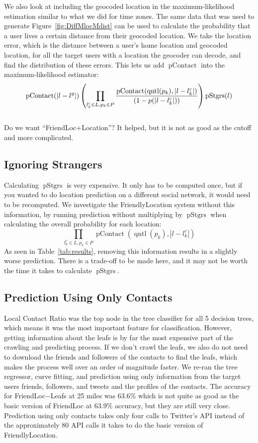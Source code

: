 \documentclass[letterpaper]{article}
\DeclareMathOperator{\pContact}{pContact}
\DeclareMathOperator{\pLocation}{pContact}
\DeclareMathOperator{\pStrangers}{pStgrs}
\DeclareMathOperator{\quantile}{qntl}
\begin{document}
We also look at including the geocoded location in the maximum-likelihood
estimation similar to what we did for time zones.
%
The same data that was used to generate Figure~\ref{fig:DiffMlocMdist} can be
used to calculate the probability that a user lives a certain distance from
their geocoded location.
%
We take the location error, which is the distance between a user's home
location and geocoded location, for all the target users with a location the
geocoder can decode, and find the distribution of these errors.
%
This lets us add $\pLocation$ into the maximum-likelihood estimator:
\[
    \pLocation(|l-l^g|)
    \left(
        \prod_{l^c_k \in L,p_k \in P}
        {\pContact(\quantile(p_k),|l-l^c_k|) \over (1-p(|l-l^c_k|))}
    \right)
    \pStrangers(l)
\]
\\{Do we want ``FriendLoc+Location''? It helped, but it is not as good as the
    cutoff and more complicated.}

\fi

\subsection{Ignoring Strangers}
Calculating $\pStrangers$ is very expensive.
%
It only has to be computed once, but if you wanted to do location prediction on
a different social network, it would need to be recomputed.
%
We investigate the FriendlyLocation system without this information, by running
prediction without multiplying by $\pStrangers$ when calculating the overall
probability for each location:
\[
    \prod_{l^c_k \in L,p_k \in P} \pContact(\quantile(p_k),|l-l^c_k|)
\]
As seen in Table~\ref{tab:results}, removing this information results in a
slightly worse prediction.
%
There is a trade-off to be made here, and it may not be worth the time it takes
to calculate $\pStrangers$.

\subsection{Prediction Using Only Contacts}
Local Contact Ratio was the top node in the tree classifier for all 5 decision
trees, which means it was the most important feature for classification.
%
However, getting information about the leafs is by far the most expensive part
of the crawling and predicting process.
%
If we don't crawl the leafs, we also do not need to download the friends and
followers of the contacts to find the leafs, which makes the process well over
an order of magnitude faster.
%
We re-ran the tree regressor, curve fitting, and prediction using only
information from the target users friends, followers, and tweets and the
profiles of the contacts.
%
The accuracy for FriendLoc$-$Leafs at 25 miles was 63.6\% which is not quite as
good as the basic version of FriendLoc at 63.9\% accuracy, but they are still
very close.
%
Prediction using only contacts takes only four calls to Twitter's API instead
of the approximately 80 API calls it takes to do the basic version of
FriendlyLocation.
\end{document}
